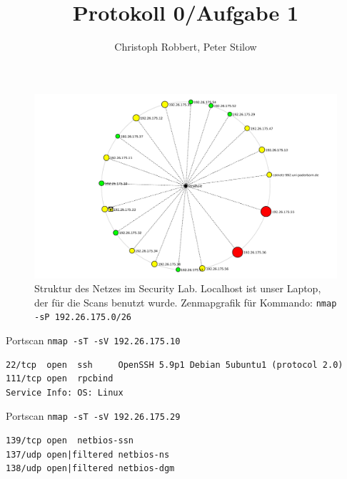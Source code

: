 \documentclass{beamer}
\author[C.Robbert, P. Stilow]{Christoph Robbert, Peter Stilow}
\institute[Uni Paderborn]{Universität Paderborn}
\title[Protokoll 0/Aufgabe 1]{Protokoll 0/Aufgabe 1}
\begin{document}
\begin{frame}
\maketitle
\end{frame}

\begin{frame}
\begin{figure}
	\label{0_netlayout}
	\includegraphics[scale=0.3]{figures/0_netlayout.pdf}
	\caption{Struktur des Netzes im Security Lab. Localhost ist unser Laptop, der für die Scans benutzt wurde. Zenmapgrafik für Kommando: \texttt{nmap -sP 192.26.175.0/26}}
\end{figure}
\end{frame}

\begin{frame}[fragile]
Portscan \texttt{nmap -sT -sV 192.26.175.10}
\begin{footnotesize}
	\begin{verbatim}
22/tcp  open  ssh     OpenSSH 5.9p1 Debian 5ubuntu1 (protocol 2.0)
111/tcp open  rpcbind
Service Info: OS: Linux
	\end{verbatim}
\end{footnotesize}

\end{frame}


\begin{frame}[fragile]
Portscan \texttt{nmap -sT -sV 192.26.175.29}
\begin{footnotesize}
	\begin{verbatim}
139/tcp open  netbios-ssn
137/udp open|filtered netbios-ns
138/udp open|filtered netbios-dgm
	\end{verbatim}
\end{footnotesize}

\end{frame}
\end{document}
